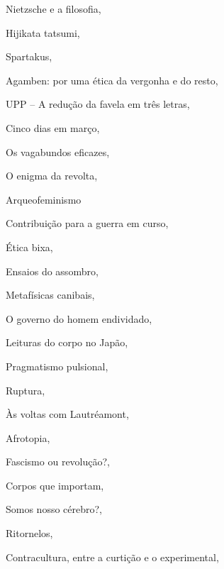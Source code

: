 \begin{multicols}{2}
\begin{enumerate}
{\item Nietzsche e a filosofia, {}
\item Hijikata tatsumi, {}
\item Spartakus, {}
\item Agamben: por uma ética da vergonha e do resto, {}
\item UPP -- A redução da favela em três letras, {}
\item Cinco dias em março, {}
\item Os vagabundos eficazes, {}
\item O enigma da revolta, {}
\item Arqueofeminismo
\item Contribuição para a guerra em curso, {}
\item Ética bixa, {}
\item Ensaios do assombro, {}
\item Metafísicas canibais, {}
\item O governo do homem endividado, {}
\item Leituras do corpo no Japão, {}
\item Pragmatismo pulsional, {}
\item Ruptura, {}
\item Às voltas com Lautréamont, {}
\item Afrotopia, {}
\item Fascismo ou revolução?, {}
\item Corpos que importam, {}
\item Somos nosso cérebro?, {}
\item Ritornelos, {}
\item Contracultura, entre a curtição e o experimental, {}
}
\end{enumerate}
\end{multicols}

\pagebreak